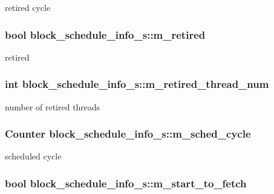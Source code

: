 \label{structblock__schedule__info__s_ac2d0055e1b2764b0c54c92ee51094e8e}
retired cycle \hypertarget{structblock__schedule__info__s_a639fb673552f73fd90dccb4ae6c5ea1c}{
\subsubsection[{m\_\-retired}]{\setlength{\rightskip}{0pt plus 5cm}bool {\bf block\_\-schedule\_\-info\_\-s::m\_\-retired}}}
\label{structblock__schedule__info__s_a639fb673552f73fd90dccb4ae6c5ea1c}
retired \hypertarget{structblock__schedule__info__s_a7194b000c4d81d80610eeec597e90e1f}{
\subsubsection[{m\_\-retired\_\-thread\_\-num}]{\setlength{\rightskip}{0pt plus 5cm}int {\bf block\_\-schedule\_\-info\_\-s::m\_\-retired\_\-thread\_\-num}}}
\label{structblock__schedule__info__s_a7194b000c4d81d80610eeec597e90e1f}
number of retired threads \hypertarget{structblock__schedule__info__s_ad967529ea12c192c606882f5e129ed0a}{
\subsubsection[{m\_\-sched\_\-cycle}]{\setlength{\rightskip}{0pt plus 5cm}Counter {\bf block\_\-schedule\_\-info\_\-s::m\_\-sched\_\-cycle}}}
\label{structblock__schedule__info__s_ad967529ea12c192c606882f5e129ed0a}
scheduled cycle \hypertarget{structblock__schedule__info__s_a2a94ce096712373fc57cde8da942cb28}{
\subsubsection[{m\_\-start\_\-to\_\-fetch}]{\setlength{\rightskip}{0pt plus 5cm}bool {\bf block\_\-schedule\_\-info\_\-s::m\_\-start\_\-to\_\-fetch}}}
